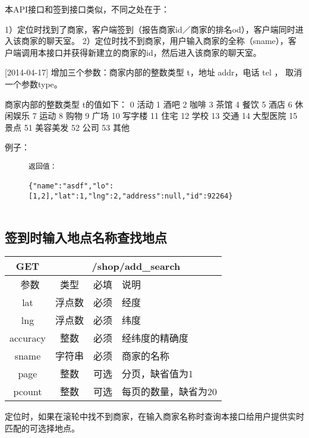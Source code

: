 \documentclass[cs4size]{ctexartutf8}
\begin{document}
本API接口和签到接口类似，不同之处在于：

1）定位时找到了商家，客户端签到（报告商家id／商家的排名od），客户端同时进入该商家的聊天室。
2）定位时找不到商家，用户输入商家的全称（sname），客户端调用本接口并获得新建立的商家的id，然后进入该商家的聊天室。


[2014-04-17] 增加三个参数：商家内部的整数类型 t，地址 addr，电话 tel ， 取消一个参数type。

商家内部的整数类型 t的值如下：
		0 活动
		1 酒吧
		2 咖啡
		3 茶馆
		4 餐饮
		5 酒店
		6 休闲娱乐
		7 运动
		8 购物
		9 广场
		10 写字楼
		11 住宅
		12 学校
		13 交通
		14 大型医院
		15 景点
		51 美容美发
		52 公司
		53 其他
		
例子：

\begin{figure}[H]
\begin{verbatim}
返回值：

{"name":"asdf","lo":[1,2],"lat":1,"lng":2,"address":null,"id":92264}


\end{verbatim}
\end{figure}



\subsection{签到时输入地点名称查找地点}

\begin{table}[H]
   \begin{center}
\begin{tabular}{|c|c|c|p{12cm}|}
\hline
GET & \multicolumn{3}{|c|}{/shop/add\_search} \\
\hline\hline
 \  参数  & 类型 & 必填 &  说明  \\
\hline
 lat  & 浮点数 & 必须 & 经度\\
\hline
 lng  &  浮点数 & 必须 & 纬度\\ 
\hline
 accuracy  & 整数 & 必须 & 经纬度的精确度\\ 
\hline
 sname  & 字符串 & 必须 &  商家的名称\\  
  \hline
 page  & 整数 & 可选 & 分页，缺省值为1\\ 
 \hline
 pcount  & 整数 & 可选 & 每页的数量，缺省为20\\ 
\hline
\end{tabular}
   \end{center}
\end{table}

定位时，如果在滚轮中找不到商家，在输入商家名称时查询本接口给用户提供实时匹配的可选择地点。
\end{document}
